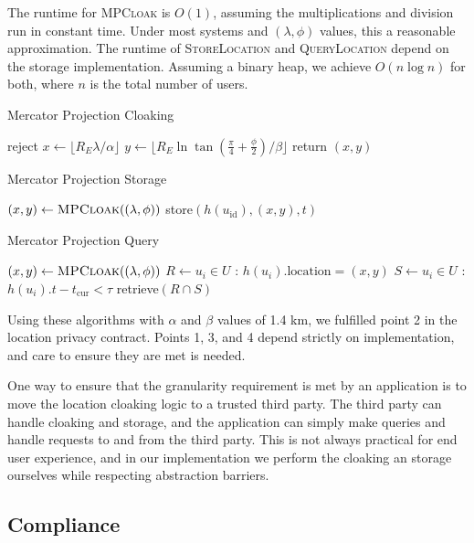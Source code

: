 The runtime for \textsc{MPCloak} is $O(1)$, assuming the multiplications and division run in constant time. Under most systems and $(\lambda, \phi)$ values, this a reasonable approximation. The runtime of \textsc{StoreLocation} and \textsc{QueryLocation} depend on the storage implementation. Assuming a binary heap, we achieve $O(n\log n)$ for both, where $n$ is the total number of users.

\begin{algorithm} \label{mercatoralgo}
\caption{Mercator Projection Cloaking} \label{mer-cloak}
\begin{algorithmic}[1]
\State reject
\EndIf
\State $x \gets \lfloor R_E\lambda / \alpha \rfloor$
\State $y \gets \lfloor R_E \ln \tan\left( \frac{\pi}{4} + \frac{\phi}{2}\right) / \beta \rfloor $
\State return $(x, y)$
\EndProcedure
\end{algorithmic}
\end{algorithm}

\begin{algorithm} \label{mercatoralgo}
\caption{Mercator Projection Storage} \label{mer-store}
\begin{algorithmic}[1]
\State $(x,y) \gets \text{\scshape MPCloak}((\lambda, \phi))$
\State store$(h(u_\text{id}), (x, y), t)$
\EndProcedure
\end{algorithmic}
\end{algorithm}

\begin{algorithm} \label{mercatoralgo}
\caption{Mercator Projection Query} \label{mer-query}
\begin{algorithmic}[1]
\State $(x,y) \gets \text{\scshape MPCloak}((\lambda, \phi))$
\State $R \gets u_i \in U$ : $h(u_i).\text{location} = (x,y)$
\State $S \gets u_i \in U$ : $h(u_i).t - t_{\text{cur}} < \tau$
\State retrieve$(R \cap S)$
\EndProcedure
\end{algorithmic}
\end{algorithm}

Using these algorithms with $\alpha$ and $\beta$ values of 1.4 km, we fulfilled point 2 in the location privacy contract. Points 1, 3, and 4 depend strictly on implementation, and care to ensure they are met is needed.

One way to ensure that the granularity requirement is met by an application is to move the location cloaking logic to a trusted third party. The third party can handle cloaking and storage, and the application can simply make queries and handle requests to and from the third party. This is not always practical for end user experience, and in our implementation we perform the cloaking an storage ourselves while respecting abstraction barriers.


\subsection{Compliance}


